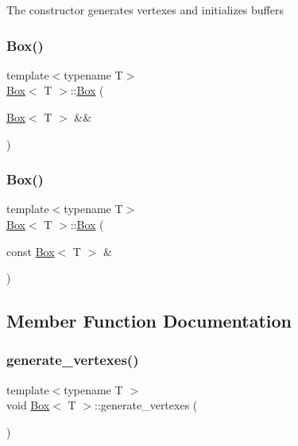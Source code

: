 The constructor generates vertexes and initializes buffers \mbox{\label{classBox_af72b67fa2f421acbe9a7d3d1bcd540d1}} 
\subsubsection{\texorpdfstring{Box()}{Box()}\hspace{0.1cm}{\footnotesize\ttfamily [2/3]}}
{\footnotesize\ttfamily template$<$typename T$>$ \\
\mbox{\hyperlink{classBox}{Box}}$<$ T $>$\+::\mbox{\hyperlink{classBox}{Box}} (\begin{DoxyParamCaption}\item[{\mbox{\hyperlink{classBox}{Box}}$<$ T $>$ \&\&}]{ }\end{DoxyParamCaption})\hspace{0.3cm}{\ttfamily [default]}}

\mbox{\label{classBox_aab49a6687d04530ec60421bcbdb929c2}} 
\subsubsection{\texorpdfstring{Box()}{Box()}\hspace{0.1cm}{\footnotesize\ttfamily [3/3]}}
{\footnotesize\ttfamily template$<$typename T$>$ \\
\mbox{\hyperlink{classBox}{Box}}$<$ T $>$\+::\mbox{\hyperlink{classBox}{Box}} (\begin{DoxyParamCaption}\item[{const \mbox{\hyperlink{classBox}{Box}}$<$ T $>$ \&}]{ }\end{DoxyParamCaption})\hspace{0.3cm}{\ttfamily [default]}}



\subsection{Member Function Documentation}
\mbox{\label{classBox_a7f7b061bf913f9ab47bff75536bc137d}} 
\subsubsection{\texorpdfstring{generate\+\_\+vertexes()}{generate\_vertexes()}}
{\footnotesize\ttfamily template$<$typename T $>$ \\
void \mbox{\hyperlink{classBox}{Box}}$<$ T $>$\+::generate\+\_\+vertexes (\begin{DoxyParamCaption}{ }\end{DoxyParamCaption})\hspace{0.3cm}{\ttfamily [private]}}



